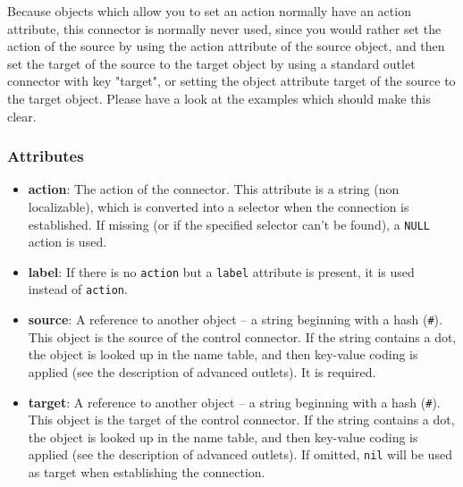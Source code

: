 Because objects which allow you to set an action normally have an
action attribute, this connector is normally never used, since you
would rather set the action of the source by using the action
attribute of the source object, and then set the target of the source
to the target object by using a standard outlet connector with key
"target", or setting the object attribute target of the source to the
target object.  Please have a look at the examples which should make
this clear.

\subsubsection{Attributes}
\begin{itemize}
\item {\bf action}: The action of the connector.  This attribute is a
  string (non localizable), which is converted into a selector when
  the connection is established.  If missing (or if the specified
  selector can't be found), a \texttt{NULL} action is used.
\item {\bf label}: If there is no \texttt{action} but a \texttt{label}
  attribute is present, it is used instead of \texttt{action}.
\item {\bf source}: A reference to another object -- a string
  beginning with a hash (\texttt{\#}).  This object is the source of
  the control connector.  If the string contains a dot, the object is
  looked up in the name table, and then key-value coding is applied
  (see the description of advanced outlets).  It is required.
\item {\bf target}: A reference to another object -- a string
  beginning with a hash (\texttt{\#}).  This object is the target of
  the control connector.  If the string contains a dot, the object is
  looked up in the name table, and then key-value coding is applied
  (see the description of advanced outlets).  If omitted, \texttt{nil}
  will be used as target when establishing the connection.
\end{itemize}

